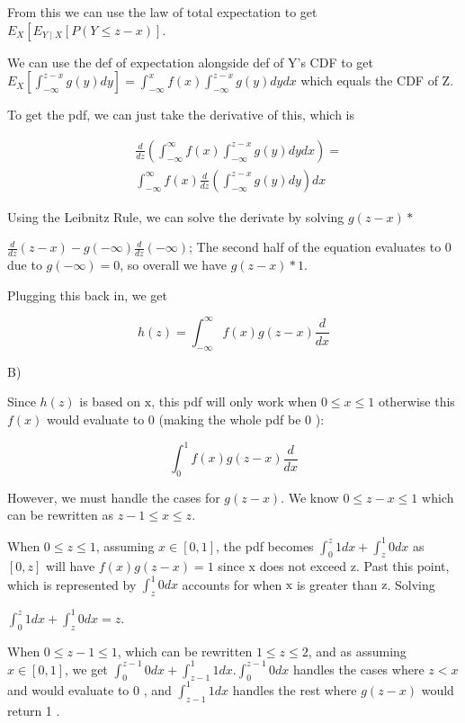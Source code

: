 \documentclass[10pt]{article}
\begin{document}
From this we can use the law of total expectation to get $E_{X}\left[E_{Y \mid X}[P(Y \leq z-x)]\right.$.

We can use the def of expectation alongside def of Y's CDF to get $E_{X}\left[\int_{-\infty}^{z-x} g(y) d y\right]=\int_{-\infty}^{x} f(x) \int_{-\infty}^{z-x} g(y) d y d x$ which equals the CDF of Z.

To get the pdf, we can just take the derivative of this, which is

$$
\begin{aligned}
& \frac{d}{d z}\left(\int_{-\infty}^{\infty} f(x) \int_{-\infty}^{z-x} g(y) d y d x\right)= \\
& \int_{-\infty}^{\infty} f(x) \frac{d}{d z}\left(\int_{-\infty}^{z-x} g(y) d y\right) d x
\end{aligned}
$$

Using the Leibnitz Rule, we can solve the derivate by solving $g(z-x) *$

$\frac{d}{d z}(z-x)-g(-\infty) \frac{d}{d z}(-\infty)$; The second half of the equation evaluates to 0 due to $g(-\infty)=0$, so overall we have $g(z-x) * 1$.

Plugging this back in, we get

$$
h(z)=\int_{-\infty}^{\infty} f(x) g(z-x) \frac{d}{d x}
$$

B)

Since $h(z)$ is based on $\mathrm{x}$, this pdf will only work when $0 \leq x \leq 1$ otherwise this $f(x)$ would evaluate to 0 (making the whole pdf be 0 ):

$$
\int_{0}^{1} f(x) g(z-x) \frac{d}{d x}
$$

However, we must handle the cases for $g(z-x)$. We know $0 \leq z-x \leq 1$ which can be rewritten as $z-1 \leq x \leq z$.

When $0 \leq z \leq 1$, assuming $x \in[0,1]$, the pdf becomes $\int_{0}^{z} 1 d x+\int_{z}^{1} 0 d x$ as $[0, z]$ will have $f(x) g(z-x)=1$ since $\mathrm{x}$ does not exceed $\mathrm{z}$. Past this point, which is represented by $\int_{z}^{1} 0 d x$ accounts for when $\mathrm{x}$ is greater than $\mathrm{z}$. Solving

$\int_{0}^{z} 1 d x+\int_{z}^{1} 0 d x=z$.

When $0 \leq z-1 \leq 1$, which can be rewritten $1 \leq z \leq 2$, and as assuming $x \in[0,1]$, we get $\int_{0}^{z-1} 0 d x+\int_{z-1}^{1} 1 d x . \int_{0}^{z-1} 0 d x$ handles the cases where $z<x$ and would evaluate to 0 , and $\int_{z-1}^{1} 1 d x$ handles the rest where $g(z-x)$ would return 1 .
\end{document}
